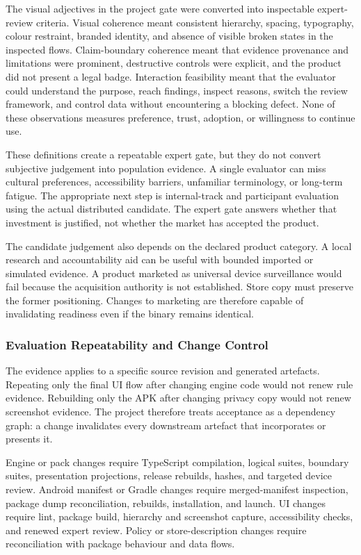 The visual adjectives in the project gate were converted into inspectable expert-review criteria. Visual coherence meant consistent hierarchy, spacing, typography, colour restraint, branded identity, and absence of visible broken states in the inspected flows. Claim-boundary coherence meant that evidence provenance and limitations were prominent, destructive controls were explicit, and the product did not present a legal badge. Interaction feasibility meant that the evaluator could understand the purpose, reach findings, inspect reasons, switch the review framework, and control data without encountering a blocking defect. None of these observations measures preference, trust, adoption, or willingness to continue use.

These definitions create a repeatable expert gate, but they do not convert subjective judgement into population evidence. A single evaluator can miss cultural preferences, accessibility barriers, unfamiliar terminology, or long-term fatigue. The appropriate next step is internal-track and participant evaluation using the actual distributed candidate. The expert gate answers whether that investment is justified, not whether the market has accepted the product.

The candidate judgement also depends on the declared product category. A local research and accountability aid can be useful with bounded imported or simulated evidence. A product marketed as universal device surveillance would fail because the acquisition authority is not established. Store copy must preserve the former positioning. Changes to marketing are therefore capable of invalidating readiness even if the binary remains identical.

\subsubsection{Evaluation Repeatability and Change Control}

The evidence applies to a specific source revision and generated artefacts. Repeating only the final UI flow after changing engine code would not renew rule evidence. Rebuilding only the APK after changing privacy copy would not renew screenshot evidence. The project therefore treats acceptance as a dependency graph: a change invalidates every downstream artefact that incorporates or presents it.

Engine or pack changes require TypeScript compilation, logical suites, boundary suites, presentation projections, release rebuilds, hashes, and targeted device review. Android manifest or Gradle changes require merged-manifest inspection, package dump reconciliation, rebuilds, installation, and launch. UI changes require lint, package build, hierarchy and screenshot capture, accessibility checks, and renewed expert review. Policy or store-description changes require reconciliation with package behaviour and data flows.

